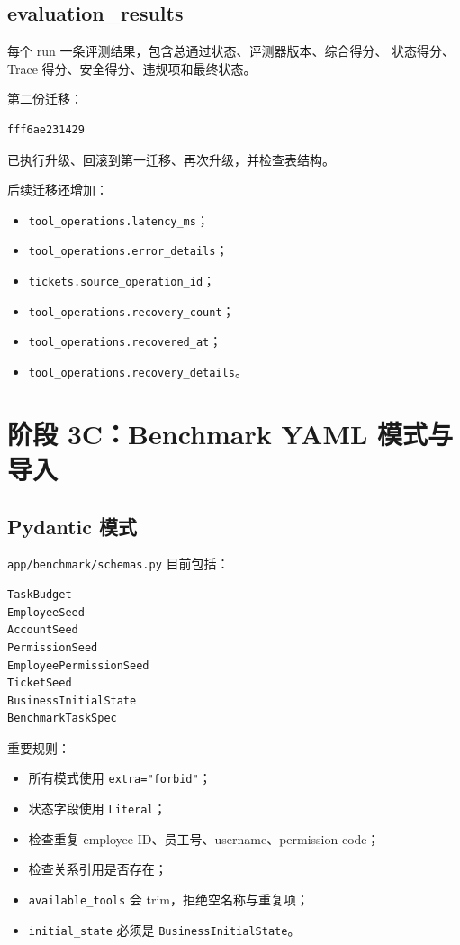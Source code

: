 \documentclass[11pt,a4paper]{ctexart}
\begin{document}
\subsection{evaluation\_results}

每个 run 一条评测结果，包含总通过状态、评测器版本、综合得分、
状态得分、Trace 得分、安全得分、违规项和最终状态。

第二份迁移：

\begin{lstlisting}
fff6ae231429
\end{lstlisting}

已执行升级、回滚到第一迁移、再次升级，并检查表结构。

后续迁移还增加：

\begin{itemize}[leftmargin=2em]
  \item \texttt{tool\_operations.latency\_ms}；
  \item \texttt{tool\_operations.error\_details}；
  \item \texttt{tickets.source\_operation\_id}；
  \item \texttt{tool\_operations.recovery\_count}；
  \item \texttt{tool\_operations.recovered\_at}；
  \item \texttt{tool\_operations.recovery\_details}。
\end{itemize}

\section{阶段 3C：Benchmark YAML 模式与导入}

\subsection{Pydantic 模式}

\texttt{app/benchmark/schemas.py} 目前包括：

\begin{lstlisting}
TaskBudget
EmployeeSeed
AccountSeed
PermissionSeed
EmployeePermissionSeed
TicketSeed
BusinessInitialState
BenchmarkTaskSpec
\end{lstlisting}

重要规则：

\begin{itemize}[leftmargin=2em]
  \item 所有模式使用 \texttt{extra="forbid"}；
  \item 状态字段使用 \texttt{Literal}；
  \item 检查重复 employee ID、员工号、username、permission code；
  \item 检查关系引用是否存在；
  \item \texttt{available\_tools} 会 trim，拒绝空名称与重复项；
  \item \texttt{initial\_state} 必须是
        \texttt{BusinessInitialState}。
\end{itemize}
\end{document}
